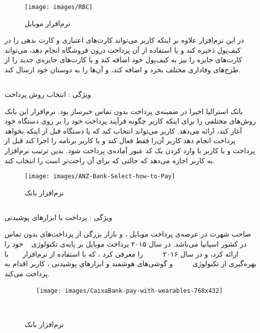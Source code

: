 \documentclass[oneside]{report}
\begin{document}
	\begin{figure}[h]
		\centering
		\texttt{[image: images/RBC]}
		\caption{نرم‌افزار موبایل 	{\normalsize {}}}
		\label{fig:rbc}
	\end{figure}
در این نرم‌افزار علاوه بر اینکه کاربر می‌تواند کارت‌‌های اعتباری 
و کارت بدهی 
		را در کیف‌پول ذخیره کند و با استفاده از آن پرداخت درون فروشگاه انجام دهد، می‌تواند کارت‌های جایزه را نیز به کیف‌پول خود اضافه کند و یا کارت‌های جایزه‌ی جدید را از طرح‌های وفاداری مختلف بخرد و اضافه کند، و آن‌ها را به دوستان خود ارسال کند.
		
		\subsection{{\small {}}}
		ویژگی : انتخاب روش پرداخت
		
		بانک 
			 {\normalsize {} }
			 	استرالیا اخیرا در ضمینه‌ی پرداخت بدون تماس 
			 	خبرساز بود. نرم‌افزار این بانک روش‌های مختلفی را برای اینکه کاربر چگونه فرآیند پرداخت خود را بر روی دستگاه خود آغاز کند، ارائه می‌دهد. کاربر می‌تواند انتخاب کند که یا دستگاه قبل از اینکه بخواهد پرداخت انجام دهد کاربر آن‌را فقط فعال کند و یا کاربر برنامه را اجرا کند قبل از پرداخت و یا کاربر با وارد کردن یک کد عبور آماده‌ی پرداخت شود. بدین ترتیب نرم‌افزار به کاربر اجازه می‌دهد
			 	که حالتی که برای آن راحت‌تر است را انتخاب کند.
			 	\begin{figure}[h]
			 		\centering
			 		\texttt{[image: images/ANZ-Bank-Select-how-to-Pay]}
			 		\caption{نرم‌افزار بانک 	{\footnotesize {}} }
			 		\label{fig:anz-bank-select-how-to-pay}
			 	\end{figure}
			 			
		\subsection{{\small {}}}
		ویژگی : پرداخت با ابزار‌های پوشیدنی
		
			 {\normalsize {}} 
			 صاحب شهرت در عرصه‌ی پرداخت موبایل ، و بازار بزرگی از پرداخت‌های بدون تماس در کشور اسپانیا می‌باشد. در سال ۲۰۱۵ پرداخت موبایل بر پایه‌ی تکنولوژی 
			  	 			 				 {\normalsize {}}
خود را ارائه کرد، و در سال ۲۰۱۶ 
	 			 {\normalsize{}}	 			 										 			 									 
		را معرفی کرد ، که با استفاده از نرم‌افزار 
			 			 				 {\normalsize {}}	
			 			 				 با بهره‌گیری از تکنولوژی‌
			 			 			 {\normalsize{}}	 	
			 			 			 و گوشی‌های هوشمند و ابزار‌های پوشیدنی ، کاربر اقدام به پرداخت می‌کند.
			 			 			 
			 			 			 \begin{figure}[h]
			 			 			 	\centering
			 			 			 	\texttt{[image: images/CaixaBank-pay-with-wearables-768x432]}
			 			 			 	\caption{نرم‌افزار بانک {\footnotesize {}}}
			 			 			 	\label{fig:caixabank-pay-with-wearables-768x432}
			 			 			 \end{figure}
			 			 			 		
\end{document}
